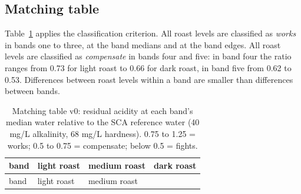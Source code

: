 \documentclass[
  a4paper,
]{article}
\begin{document}
\subsection{Matching table}\label{matching-table}

Table~\ref{tbl-matching} applies the classification criterion. All roast
levels are classified as \emph{works} in bands one to three, at the band
medians and at the band edges. All roast levels are classified as
\emph{compensate} in bands four and five: in band four the ratio ranges
from 0.73 for light roast to 0.66 for dark roast, in band five from 0.62
to 0.53. Differences between roast levels within a band are smaller than
differences between bands.

\begin{longtable}[]{@{}
  >{\raggedright\arraybackslash}p{}
  >{\raggedright\arraybackslash}p{}
  >{\raggedright\arraybackslash}p{}
  >{\raggedright\arraybackslash}p{}@{}}
\caption{Matching table v0: residual acidity at each band's median water
relative to the SCA reference water (40 mg/L alkalinity, 68 mg/L
hardness). 0.75 to 1.25 = works; 0.5 to 0.75 = compensate; below 0.5 =
fights.}\label{tbl-matching}\tabularnewline
\toprule\noalign{}
\begin{minipage}[b]{\linewidth}\raggedright
band
\end{minipage} & \begin{minipage}[b]{\linewidth}\raggedright
light roast
\end{minipage} & \begin{minipage}[b]{\linewidth}\raggedright
medium roast
\end{minipage} & \begin{minipage}[b]{\linewidth}\raggedright
dark roast
\end{minipage} \\
\midrule\noalign{}
\endfirsthead
\toprule\noalign{}
\begin{minipage}[b]{\linewidth}\raggedright
band
\end{minipage} & \begin{minipage}[b]{\linewidth}\raggedright
light roast
\end{minipage} & \begin{minipage}[b]{\linewidth}\raggedright
medium roast
\end{minipage} & \begin{minipage}[b]{\linewidth}\raggedright

\end{minipage}
\end{longtable}
\end{document}
